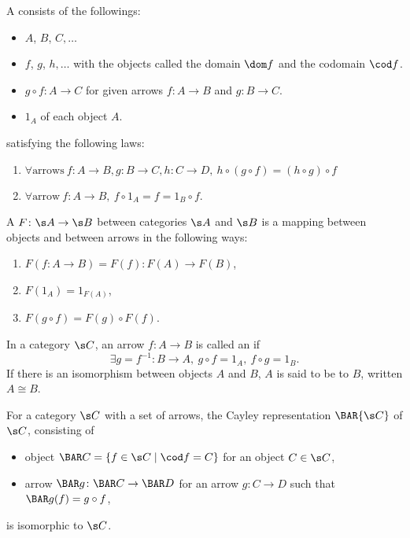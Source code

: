 \newcommand{\sets}{\mathbf{Sets}}
\newcommand{\op}[1]{{#1}^{\mathrm{op}}}
\newcommand{\arr}[1]{{#1}^{\rightarrow}}
\cite{awodey}
A  consists of the followings:
\begin{itemize}
\item {} $A$, $B$, $C, \dotsc$
\item {} $f$, $g$, $h, \dotsc$ with the objects called the domain $\dom f$ and the codomain $\cod f$.
\item {} $g \circ f \colon A \to C$ for given arrows $f \colon A \to B$ and $g \colon B \to C$.
\item {} $1_A$ of each object $A$.
\end{itemize}
satisfying the following laws:
\begin{enumerate}
\item $\forall \text{arrows}\ f \colon A \to B, g \colon B \to C, h \colon C \to D,\ h \circ (g \circ f) = (h \circ g) \circ f$
\item $\forall \text{arrow}\ f \colon A \to B,\ f \circ 1_A = f = 1_B \circ f$.
\end{enumerate}

A  $F\colon \s A \to \s B$ between categories $\s A$ and $\s B$ is a mapping between objects and between arrows in the following ways:
\begin{enumerate}
\item $F(f\colon A \to B) = F(f) \colon F(A) \to F(B)$,
\item $F(1_A) = 1_{F(A)}$,
\item $F(g \circ f) = F(g) \circ F(f)$.
\end{enumerate}

In a category $\s C$, an arrow $f \colon A \to B$ is called an  if
\[
\exists g = f^{-1} \colon B \to A,\ g \circ f = 1_A,\ f \circ g = 1_B.
\]
If there is an isomorphism between objects $A$ and $B$, $A$ is said to be  to $B$, written $A \cong B$.

For a category $\s C$ with a set of arrows, the Cayley representation $\BAR{\s C}$ of $\s C$, consisting of
\begin{itemize}
  \item object $\BAR C = \{ f \in \s C \mid \cod f = C \}$ for an object $C \in \s C$,
  \item arrow $\BAR g \colon \BAR C \to \BAR D$ for an arrow $g \colon C \to D$ such that $\BAR g (f) = g \circ f$,
\end{itemize}
is isomorphic to $\s C$.

